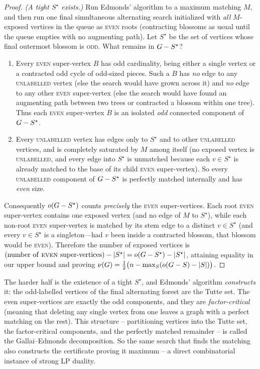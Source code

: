\begin{proof}
\emph{(A tight $S^{\star}$ exists.)} Run Edmonds' algorithm to a maximum matching $M$, and then run one
final simultaneous alternating search initialized with \emph{all} $M$-exposed vertices in the queue as
\textsc{even} roots (contracting blossoms as usual until the queue empties with no augmenting path).
Let $S^{\star}$ be the set of vertices whose final outermost blossom is \textsc{odd}. What remains in
$G - S^{\star}$?
\begin{enumerate}
\item Every \textsc{even} super-vertex $B$ has odd cardinality, being either a single vertex or a
contracted odd cycle of odd-sized pieces. Such a $B$ has \emph{no} edge to any \textsc{unlabelled}
vertex (else the search would have grown across it) and \emph{no} edge to any other \textsc{even}
super-vertex (else the search would have found an augmenting path between two trees or contracted a
blossom within one tree). Thus each \textsc{even} super-vertex $B$ is an isolated \emph{odd} connected
component of $G - S^{\star}$.
\item Every \textsc{unlabelled} vertex has edges only to $S^{\star}$ and to other \textsc{unlabelled}
vertices, and is completely saturated by $M$ among itself (no exposed vertex is \textsc{unlabelled}, and
every edge into $S^{\star}$ is unmatched because each $v\in S^{\star}$ is already matched to the base
of its child \textsc{even} super-vertex). So every \textsc{unlabelled} component of $G - S^{\star}$
is perfectly matched internally and has \emph{even} size.
\end{enumerate}
Consequently $o(G - S^{\star})$ counts \emph{precisely} the \textsc{even} super-vertices. Each root
\textsc{even} super-vertex contains one exposed vertex (and no edge of $M$ to $S^{\star}$), while each
non-root \textsc{even} super-vertex is matched by its stem edge to a distinct $v\in S^{\star}$ (and
every $v\in S^{\star}$ is a singleton---had $v$ been inside a contracted blossom, that blossom would be
\textsc{even}). Therefore the number of exposed vertices is
$(\text{number of \textsc{even} super-vertices}) - \lvert S^{\star}\rvert = o(G - S^{\star}) - \lvert S^{\star}\rvert$,
attaining equality in our upper bound and proving $\nu(G)=\tfrac12\bigl(n-\max_S(o(G-S)-\lvert S\rvert)\bigr)$.
\end{proof}

\begin{whybox}
The harder half is the existence of a tight $S^{\star}$, and Edmonds' algorithm \emph{constructs} it:
the odd-labelled vertices of the final alternating forest are the Tutte set. The even super-vertices are exactly the odd components, and they are \emph{factor-critical} (meaning that deleting any single vertex from one leaves a graph with a perfect matching on the rest). This structure -- partitioning vertices into the Tutte set, the factor-critical components, and the perfectly matched remainder -- is called the Gallai--Edmonds decomposition. So the same search that finds the matching also constructs the certificate proving it
maximum -- a direct combinatorial instance of strong LP duality.
\end{whybox}

